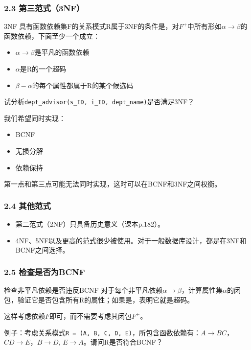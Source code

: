\documentclass[aspectratio=169, 14pt]{beamer}
\begin{document}
\begin{frame}
    \frametitle{2.3 第三范式（3NF）}
\begin{exampleblock}{3NF}
    具有函数依赖集F的关系模式R属于3NF的条件是，对$F^+$中所有形如$\alpha \rightarrow \beta$的函数依赖，下面至少一个成立：
    \begin{itemize}
        \item $\alpha \rightarrow \beta$是平凡的函数依赖
        \item $\alpha$是R的一个超码
        \item $\beta - \alpha$的每个属性都属于R的某个候选码
    \end{itemize}    
\end{exampleblock}
 试分析\texttt{dept\_advisor(s\_ID, i\_ID, dept\_name)}是否满足3NF？
\end{frame}

{
\begin{frame}[standout]
我们希望同时实现：

\begin{itemize}
    \item BCNF
    \item 无损分解
    \item 依赖保持
\end{itemize}

{\small 第一点和第三点可能无法同时实现，这时可以在BCNF和3NF之间权衡。}
\end{frame}
}

\begin{frame}
    \frametitle{2.4 其他范式}
\begin{itemize}
    \item 第二范式（2NF）只具备历史意义（课本p.182）。
    \item 4NF、5NF以及更高的范式很少被使用。对于一般数据库设计，\alert{都是在3NF和BCNF之间选择。}
\end{itemize}
    

\end{frame}

\begin{frame}
    \frametitle{2.5 检查是否为BCNF}
\begin{exampleblock}{检查非平凡依赖是否违反BCNF}
    对于每个非平凡依赖$\alpha \rightarrow \beta$，计算属性集$\alpha$的闭包，验证它是否包含所有R的属性；如果是，表明它就是超码。    
\end{exampleblock}
这样考虑依赖$F$即可，而不需要考虑其闭包$F^+$。

\pause 
{} 例子：考虑关系模式\texttt{R = (A, B, C, D, E)}，所包含函数依赖有：$A \rightarrow BC$，$CD \rightarrow E$，$B \rightarrow D$, $E \rightarrow A$。请问R是否符合BCNF？

\end{frame}
\end{document}
